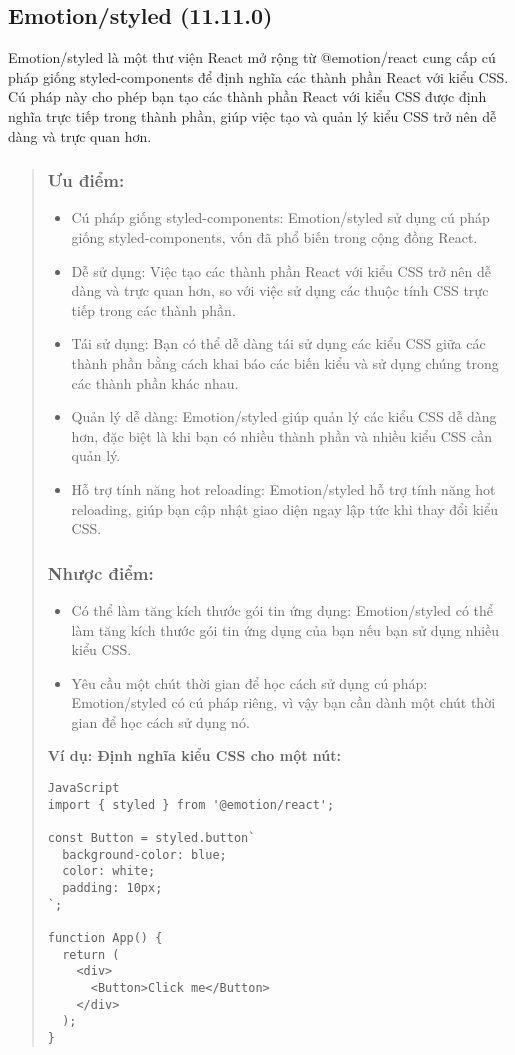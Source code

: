 \subsection{Emotion/styled (11.11.0)}

Emotion/styled là một thư viện React mở rộng từ @emotion/react cung cấp cú pháp giống styled-components để định nghĩa các thành phần React với kiểu CSS. Cú pháp này cho phép bạn tạo các thành phần React với kiểu CSS được định nghĩa trực tiếp trong thành phần, giúp việc tạo và quản lý kiểu CSS trở nên dễ dàng và trực quan hơn.
\begin{quote}
\subsubsection{Ưu điểm:}
\begin{itemize}
    \item Cú pháp giống styled-components: Emotion/styled sử dụng cú pháp giống styled-components, vốn đã phổ biến trong cộng đồng React.
    \item Dễ sử dụng: Việc tạo các thành phần React với kiểu CSS trở nên dễ dàng và trực quan hơn, so với việc sử dụng các thuộc tính CSS trực tiếp trong các thành phần.
    \item Tái sử dụng: Bạn có thể dễ dàng tái sử dụng các kiểu CSS giữa các thành phần bằng cách khai báo các biến kiểu và sử dụng chúng trong các thành phần khác nhau.
    \item Quản lý dễ dàng: Emotion/styled giúp quản lý các kiểu CSS dễ dàng hơn, đặc biệt là khi bạn có nhiều thành phần và nhiều kiểu CSS cần quản lý.
    \item Hỗ trợ tính năng hot reloading: Emotion/styled hỗ trợ tính năng hot reloading, giúp bạn cập nhật giao diện ngay lập tức khi thay đổi kiểu CSS.
\end{itemize}
\subsubsection{Nhược điểm:}
\begin{itemize}
    \item Có thể làm tăng kích thước gói tin ứng dụng: Emotion/styled có thể làm tăng kích thước gói tin ứng dụng của bạn nếu bạn sử dụng nhiều kiểu CSS.
    \item Yêu cầu một chút thời gian để học cách sử dụng cú pháp: Emotion/styled có cú pháp riêng, vì vậy bạn cần dành một chút thời gian để học cách sử dụng nó.
    \end{itemize}
    \textbf{Ví dụ: Định nghĩa kiểu CSS cho một nút:}
\begin{lstlisting}
JavaScript
import { styled } from '@emotion/react';

const Button = styled.button`
  background-color: blue;
  color: white;
  padding: 10px;
`;

function App() {
  return (
    <div>
      <Button>Click me</Button>
    </div>
  );
}
\end{lstlisting}

\end{quote}

